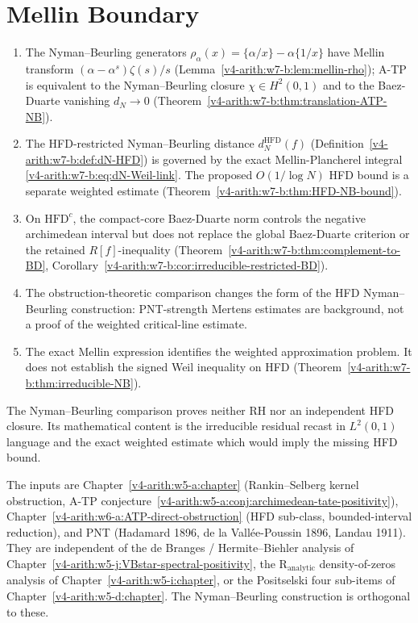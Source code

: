 \section{Mellin Boundary}
\label{v4-arith:w7-b:summary}

\begin{enumerate}
\item The Nyman--Beurling generators
\(\rho_{\alpha}(x)=\{\alpha/x\}-\alpha\{1/x\}\) have Mellin transform
\((\alpha-\alpha^s)\zeta(s)/s\)
(Lemma~\ref{v4-arith:w7-b:lem:mellin-rho}); A-TP is equivalent to the
Nyman--Beurling closure \(\chi\in H^{2}(0,1)\) and to the Baez-Duarte
vanishing \(d_{N}\to 0\)
(Theorem~\ref{v4-arith:w7-b:thm:translation-ATP-NB}).
\item The HFD-restricted Nyman--Beurling distance
\(d_{N}^{\mathrm{HFD}}(f)\)
(Definition~\ref{v4-arith:w7-b:def:dN-HFD}) is governed by the exact
Mellin-Plancherel integral \eqref{v4-arith:w7-b:eq:dN-Weil-link}. The
proposed \(O(1/\log N)\) HFD bound is a separate weighted estimate
(Theorem~\ref{v4-arith:w7-b:thm:HFD-NB-bound}).
\item On \(\mathrm{HFD}^{c}\), the compact-core Baez-Duarte norm
controls the negative archimedean interval but does not replace the
global Baez-Duarte criterion or the retained \(R[f]\)-inequality
(Theorem~\ref{v4-arith:w7-b:thm:complement-to-BD},
Corollary~\ref{v4-arith:w7-b:cor:irreducible-restricted-BD}).
\item The obstruction-theoretic comparison changes the form of the HFD
Nyman--Beurling construction: PNT-strength Mertens estimates are background,
not a proof of the weighted critical-line estimate.
\item The exact Mellin expression identifies the weighted approximation
problem. It does not establish the signed Weil inequality on HFD
(Theorem~\ref{v4-arith:w7-b:thm:irreducible-NB}).
\end{enumerate}

\begin{remark}
\label{v4-arith:w7-b:rem:beilinson-closing}
The Nyman--Beurling comparison proves neither RH nor an independent
HFD closure. Its mathematical content is the irreducible residual
recast in \(L^{2}(0,1)\) language and the exact weighted estimate which
would imply the missing HFD bound.
\end{remark}

\begin{remark}
\label{v4-arith:w7-b:rem:cross-volume}
The inputs are Chapter~\ref{v4-arith:w5-a:chapter}
(Rankin--Selberg kernel obstruction, A-TP
conjecture~\ref{v4-arith:w5-a:conj:archimedean-tate-positivity}),
Chapter~\ref{v4-arith:w6-a:ATP-direct-obstruction} (HFD sub-class,
bounded-interval reduction), and PNT
(Hadamard 1896, de la Vall\'ee-Poussin 1896, Landau 1911). They are
independent of the de Branges / Hermite--Biehler analysis of
Chapter~\ref{v4-arith:w5-j:VBstar-spectral-positivity}, the
\(\mathrm{R}_{\mathrm{analytic}}\) density-of-zeros analysis of
Chapter~\ref{v4-arith:w5-i:chapter}, or the Positselski four
sub-items of
Chapter~\ref{v4-arith:w5-d:chapter}. The Nyman--Beurling construction is
orthogonal to these.
\end{remark}
